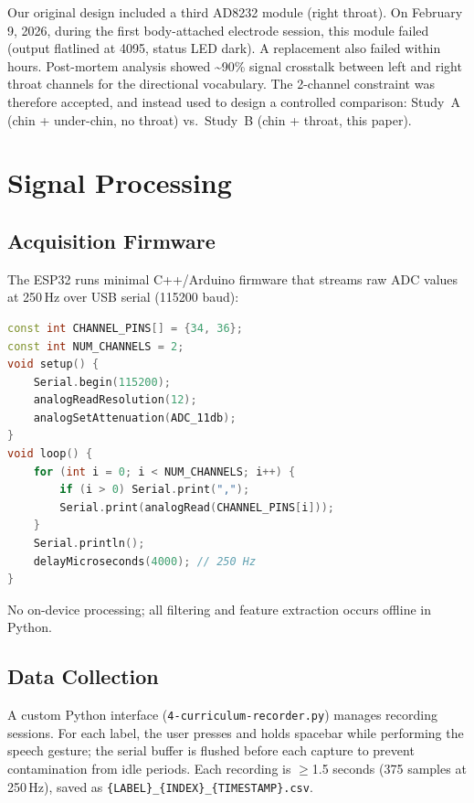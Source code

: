 \documentclass[11pt, a4paper]{article}
\begin{document}
Our original design included a third AD8232 module (right throat). On February 9, 2026, during the first body-attached electrode session, this module failed (output flatlined at 4095, status LED dark). A replacement also failed within hours. Post-mortem analysis showed \textasciitilde90\% signal crosstalk between left and right throat channels for the directional vocabulary. The 2-channel constraint was therefore accepted, and instead used to design a controlled comparison: Study~A (chin + under-chin, no throat) vs.\ Study~B (chin + throat, this paper).

\section{Signal Processing}
\label{sec:signal}

\subsection{Acquisition Firmware}

The ESP32 runs minimal C++/Arduino firmware that streams raw ADC values at 250\,Hz over USB serial (115200 baud):

\begin{lstlisting}[language=C++, caption={ESP32 acquisition firmware.}]
const int CHANNEL_PINS[] = {34, 36};
const int NUM_CHANNELS = 2;
void setup() {
    Serial.begin(115200);
    analogReadResolution(12);
    analogSetAttenuation(ADC_11db);
}
void loop() {
    for (int i = 0; i < NUM_CHANNELS; i++) {
        if (i > 0) Serial.print(",");
        Serial.print(analogRead(CHANNEL_PINS[i]));
    }
    Serial.println();
    delayMicroseconds(4000); // 250 Hz
}
\end{lstlisting}

No on-device processing; all filtering and feature extraction occurs offline in Python.

\subsection{Data Collection}

A custom Python interface (\texttt{4-curriculum-recorder.py}) manages recording sessions. For each label, the user presses and holds spacebar while performing the speech gesture; the serial buffer is flushed before each capture to prevent contamination from idle periods. Each recording is $\geq$1.5 seconds (375 samples at 250\,Hz), saved as \texttt{\{LABEL\}\_\{INDEX\}\_\{TIMESTAMP\}.csv}.
\end{document}
